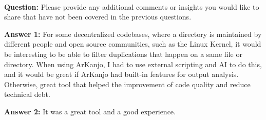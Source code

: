 \

\textbf{Question:} Please provide any additional comments or insights you would like to 
share that have not been covered in the previous questions.

\textbf{Answer 1:} For some decentralized codebases, where a directory is maintained by different people 
and open source communities, such as the Linux Kernel, it would be interesting to be able to filter 
duplications that happen on a same file or directory. When using ArKanjo, I had to use external scripting 
and AI to do this, and it would be great if ArKanjo had built-in features for output analysis.
Otherwise, great tool that helped the improvement of code quality and reduce technical debt.

\textbf{Answer 2:} It was a great tool and a good experience.
